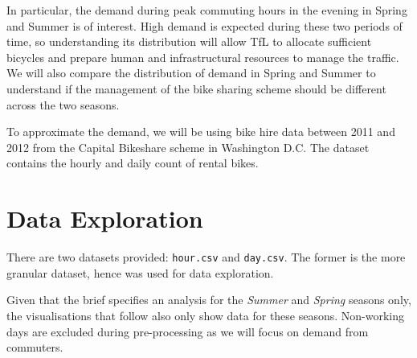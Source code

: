 In particular, the demand during peak commuting hours in the evening in Spring and Summer is of interest. High demand is expected during these two periods of time, so understanding its distribution will allow TfL to allocate sufficient bicycles and prepare human and infrastructural resources to manage the traffic. We will also compare the distribution of demand in Spring and Summer to understand if the management of the bike sharing scheme should be different across the two seasons.

To approximate the demand, we will be using bike hire data between 2011 and 2012 from the Capital Bikeshare scheme in Washington D.C. \cite{data} The dataset contains the hourly and daily count of rental bikes.



\section{Data Exploration}
There are two datasets provided: \texttt{hour.csv} and \texttt{day.csv}. The former is the more granular dataset, hence was used for data exploration.

Given that the brief specifies an analysis for the \textit{Summer} and \textit{Spring} seasons only, the visualisations that follow also only show data for these seasons. Non-working days are excluded during pre-processing as we will focus on demand from commuters.

\begin{comment}
The figure below shows the total bike rental by hour for the \textit{Spring} season across \textit{workingday} on the vertical axis and split by \textit{year}

\texttt{[image: images/image4.jpeg]}

The figure below shows the total bike rental by hour for the \textit{Summer} season across \textit{workingday} on the vertical axis and split by \textit{year}

\texttt{[image: images/image5.jpeg]}

From the previous two figures, there is a common general trend for both years of the data provided. Hence, for our analysis, the average of the two years will be considered in the later parts of the analysis.
\end{comment}

